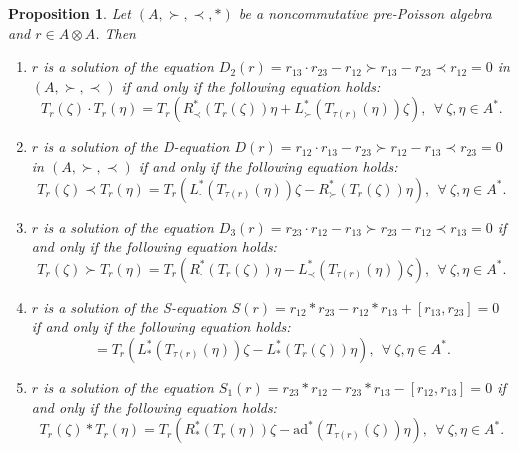 \documentclass[12pt]{amsart}
\newtheorem{pro}[thm]{Proposition}
\theoremstyle{definition}
\begin{document}
\begin{pro} \label{Ya1} Let $(A,\succ,\prec,\ast)$ be a noncommutative pre-Poisson algebra and
$r\in A\otimes A$. Then 
 \begin{enumerate}
 \item $r$ is a solution of the
equation $ D_2(r)=r_{13}\cdot r_{23}-r_{12}\succ r_{13}-r_{23}\prec r_{12}=0$
in $(A,\succ,\prec)$
 if and only if the following equation holds:
 \begin{equation*}T_{r}(\zeta)\cdot T_{r}(\eta)=T_{r}(R_{\prec}^{*}(T_{r}(\zeta))\eta
 +L_{\succ}^{*}(T_{\tau(r)}(\eta))\zeta),~~\forall~\zeta,\eta\in A^{*}.
\end{equation*}
\item $r$ is a solution of the
D-equation 
$ D(r)=r_{12}\cdot r_{13}-r_{23}\succ r_{12}-r_{13}\prec r_{23}=0$ in $(A,\succ,\prec)$
 if and only if the following equation holds:
 \begin{equation*}T_{r}(\zeta)\prec T_{r}(\eta)=T_{r}(L_{\cdot}^{*}(T_{\tau(r)}(\eta))\zeta
 -R_{\succ}^{*}(T_{r}(\zeta))\eta),~~\forall~\zeta,\eta\in A^{*}.
\end{equation*}
\item $r$ is a solution of the equation 
$D_3(r)=r_{23}\cdot r_{12}-r_{13}\succ r_{23}-r_{12}\prec r_{13}=0$
if and only if the following equation holds:
\begin{equation*}T_{r}(\zeta)\succ T_{r}(\eta)=T_{r}(R_{\cdot}^{*}(T_{r}(\zeta))\eta
 -L_{\prec}^{*}(T_{\tau(r)}(\eta))\zeta),~~\forall~\zeta,\eta\in A^{*}.
 \end{equation*}
 \item  $r$ is a solution of the S-equation
$S(r)=r_{12}\ast r_{23}-r_{12}\ast r_{13}+[r_{13}, r_{23}]=0$
if and only if the following equation holds:
  \begin{equation*}[T_{r}(\zeta), T_{r}(\eta)]=T_{r}(L_{\ast}^{*}(T_{\tau(r)}(\eta))\zeta-
 L_{\ast}^{*}(T_{r}(\zeta))\eta),~~\forall~\zeta,\eta\in A^{*}.
\end{equation*}
\item $r$ is a solution of the equation 
$S_{1}(r)= r_{23}\ast r_{12}-r_{23}\ast r_{13}-[r_{12}, r_{13}]=0$
if and only if the following equation holds:
  \begin{equation*}T_{r}(\zeta)\ast T_{r}(\eta)=T_{r}(R_{\ast}^{*}(T_{r}(\eta))\zeta-\mathrm{ad}^{*}(T_{\tau(r)}(\zeta))\eta
 ),~~\forall~\zeta,\eta\in A^{*}.
\end{equation*}
\end{enumerate}
\end{pro}
\end{document}
